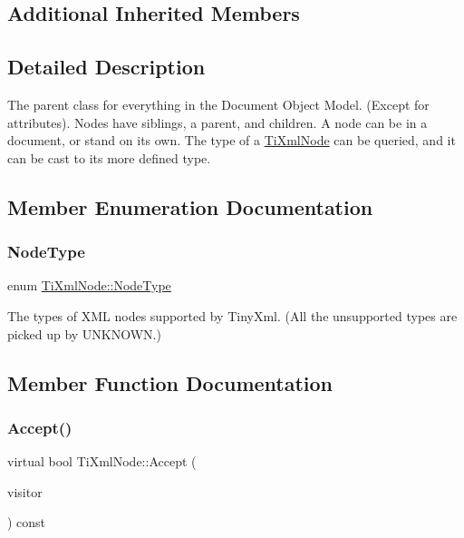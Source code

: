 \subsection*{Additional Inherited Members}


\subsection{Detailed Description}
The parent class for everything in the Document Object Model. (Except for attributes). Nodes have siblings, a parent, and children. A node can be in a document, or stand on its own. The type of a \hyperlink{classTiXmlNode}{Ti\+Xml\+Node} can be queried, and it can be cast to its more defined type. 

\subsection{Member Enumeration Documentation}
\mbox{\label{classTiXmlNode_a836eded4920ab9e9ef28496f48cd95a2}} 
\subsubsection{\texorpdfstring{Node\+Type}{NodeType}}
{\footnotesize\ttfamily enum \hyperlink{classTiXmlNode_a836eded4920ab9e9ef28496f48cd95a2}{Ti\+Xml\+Node\+::\+Node\+Type}}

The types of X\+ML nodes supported by Tiny\+Xml. (All the unsupported types are picked up by U\+N\+K\+N\+O\+WN.) 

\subsection{Member Function Documentation}
\mbox{\label{classTiXmlNode_acc0f88b7462c6cb73809d410a4f5bb86}} 
\subsubsection{\texorpdfstring{Accept()}{Accept()}}
{\footnotesize\ttfamily virtual bool Ti\+Xml\+Node\+::\+Accept (\begin{DoxyParamCaption}\item[{\hyperlink{classTiXmlVisitor}{Ti\+Xml\+Visitor} $\ast$}]{visitor }\end{DoxyParamCaption}) const\hspace{0.3cm}{\ttfamily [pure virtual]}}

